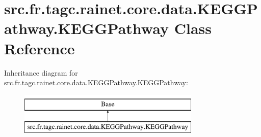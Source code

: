\hypertarget{classsrc_1_1fr_1_1tagc_1_1rainet_1_1core_1_1data_1_1KEGGPathway_1_1KEGGPathway}{\section{src.\-fr.\-tagc.\-rainet.\-core.\-data.\-K\-E\-G\-G\-Pathway.\-K\-E\-G\-G\-Pathway Class Reference}
\label{classsrc_1_1fr_1_1tagc_1_1rainet_1_1core_1_1data_1_1KEGGPathway_1_1KEGGPathway}
}
Inheritance diagram for src.\-fr.\-tagc.\-rainet.\-core.\-data.\-K\-E\-G\-G\-Pathway.\-K\-E\-G\-G\-Pathway\-:\begin{figure}[H]
\begin{center}
\leavevmode
\includegraphics[height=2.000000cm]{classsrc_1_1fr_1_1tagc_1_1rainet_1_1core_1_1data_1_1KEGGPathway_1_1KEGGPathway}
\end{center}
\end{figure}
